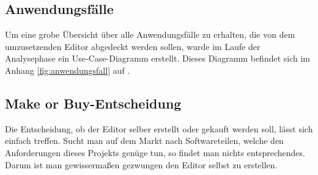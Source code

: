 \subsection{Anwendungsfälle}

Um eine grobe Übersicht über alle Anwendungsfälle zu erhalten, die von dem umzusetzenden Editor
abgedeckt werden sollen, wurde im Laufe der Analysephase ein Use-Case-Diagramm erstellt. Dieses
Diagramm befindet sich im Anhang \autoref{fig:anwendungsfall} auf .

\subsection{\glqq Make or Buy\grqq -Entscheidung}
Die Entscheidung, ob der Editor selber erstellt oder gekauft werden soll, lässt sich einfach treffen. Sucht man auf dem Markt nach Softwareteilen, welche den Anforderungen dieses Projekts genüge tun, so findet man nichts entsprechendes. Darum ist man gewissermaßen gezwungen den Editor selbst zu erstellen.

\newpage
